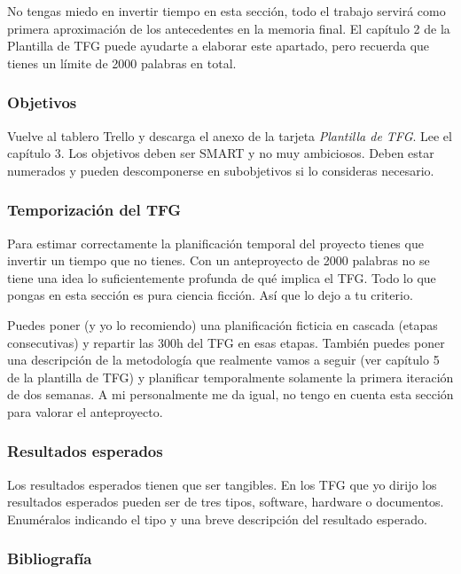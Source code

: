 No tengas miedo en invertir tiempo en esta sección, todo el trabajo servirá como primera aproximación de los antecedentes en la memoria final. El capítulo 2 de la Plantilla de TFG puede ayudarte a elaborar este apartado, pero recuerda que tienes un límite de 2000 palabras en total.

\subsubsection{Objetivos}

Vuelve al tablero Trello y descarga el anexo de la tarjeta \emph{Plantilla de TFG}.  Lee el capítulo 3.  Los objetivos deben ser SMART y no muy ambiciosos.  Deben estar numerados y pueden descomponerse en subobjetivos si lo consideras necesario.

\subsubsection{Temporización del TFG}

Para estimar correctamente la planificación temporal del proyecto tienes que invertir un tiempo que no tienes.  Con un anteproyecto de 2000 palabras no se tiene una idea lo suficientemente profunda de qué implica el TFG.  Todo lo que pongas en esta sección es pura ciencia ficción.  Así que lo dejo a tu criterio.

Puedes poner (y yo lo recomiendo) una planificación ficticia en cascada (etapas consecutivas) y repartir las 300h del TFG en esas etapas.  También puedes poner una descripción de la metodología que realmente vamos a seguir (ver capítulo 5 de la plantilla de TFG) y planificar temporalmente solamente la primera iteración de dos semanas.  A mi personalmente me da igual, no tengo en cuenta esta sección para valorar el anteproyecto.

\subsubsection{Resultados esperados}

Los resultados esperados tienen que ser tangibles.  En los TFG que yo dirijo los resultados esperados pueden ser de tres tipos, software, hardware o documentos.  Enuméralos indicando el tipo y una breve descripción del resultado esperado.

\subsubsection{Bibliografía}


